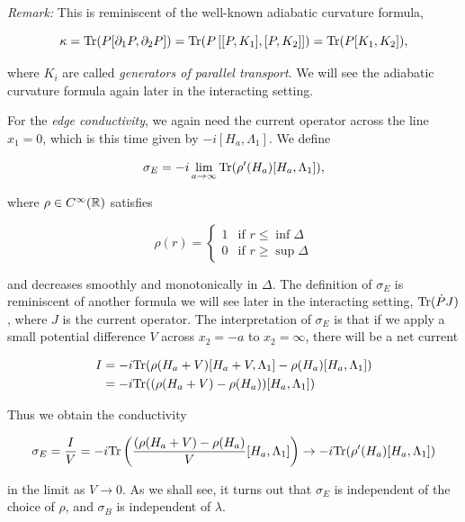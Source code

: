 \documentclass[12pt, letterpaper]{article}
\begin{document}
\textit{Remark:} This is reminiscent of the well-known adiabatic curvature formula,

\[\kappa = \text{Tr}(P[\partial_1P,\partial_2 P]) = \text{Tr}(P\left[ [P,K_1], [P,K_2] \right]) = \text{Tr}(P[K_1,K_2]),\]

where $K_i$ are called \textit{generators of parallel transport}. We will see the adiabatic curvature formula again later in the interacting setting. 

For the \textit{edge conductivity}, we again need the current operator across the line $x_1=0$, which is this time given by $-i[H_a,\Lambda_1]$. We define 

\[\sigma_E = -i\lim_{a\to\infty}\text{Tr}(\rho'(H_a)[H_a,\Lambda_1]),\]

where $\rho \in C^\infty(\mathbb{R})$ satisfies

\[\rho(r) = \begin{cases} 1 & \text{if } r\leq\inf\Delta\\ 0 & \text{if } r\geq\sup\Delta\end{cases}\]

and decreases smoothly and monotonically in $\Delta$. The definition of $\sigma_E$ is reminiscent of another formula we will see later in the interacting setting, $\text{Tr}(\dot{P}J)$, where $J$ is the current operator. The interpretation of $\sigma_E$ is that if we apply a small potential difference $V$ across $x_2=-a$ to $x_2=\infty$, there will be a net current

\[\begin{aligned}
I &= -i\text{Tr}(\rho(H_a+V)[H_a+V,\Lambda_1] - \rho(H_a)[H_a,\Lambda_1])\\
&= -i\text{Tr}((\rho(H_a+V)-\rho(H_a))[H_a,\Lambda_1])
\end{aligned}\]

Thus we obtain the conductivity

\[\sigma_E = \frac{I}{V} = -i\text{Tr}\left(\frac{(\rho(H_a+V)-\rho(H_a)}{V}[H_a,\Lambda_1]\right) \to -i\text{Tr}(\rho'(H_a)[H_a,\Lambda_1])\]

in the limit as $V\to0$. As we shall see, it turns out that $\sigma_E$ is independent of the choice of $\rho$, and $\sigma_B$ is independent of $\lambda$. 




\end{document}
